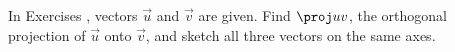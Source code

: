 {\noindent In Exercises}
{, vectors $\vec u$ and $\vec v$ are given. Find $\proj uv$, the orthogonal projection of $\vec u$ onto $\vec v$, and sketch all three vectors on the same axes.
}
